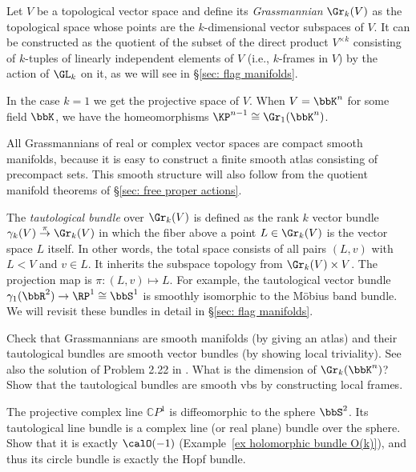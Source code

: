 \begin{example}
    Let $V$ be a topological vector space and define its \emph{Grassmannian} $\Gr_k(V)$ as the topological space whose points are the $k$-dimensional vector subspaces of $V$. It can be constructed as the quotient of the subset of the direct product $V^{\times k}$ consisting of $k$-tuples of linearly independent elements of $V$ (i.e., $k$-frames in $V$) by the action of $\GL_k$ on it, as we will see in \S\ref{sec: flag manifolds}.
    
    In the case $k=1$ we get the projective space of $V$. When $V=\bbK^n$ for some field $\bbK$, we have the homeomorphisms $\KP^{n-1}\cong \Gr_1(\bbK^n)$.
    
    All Grassmannians of real or complex vector spaces are compact smooth manifolds, because it is easy to construct a finite smooth atlas consisting of precompact sets. This smooth structure will also follow from the quotient manifold theorems of \S\ref{sec: free proper actions}.
    
    The \emph{tautological bundle} over $\Gr_k(V)$ is defined as the rank $k$ vector bundle $\gamma_{k}(V)\overset\pi\to \Gr_k(V)$ in which the fiber above a point $L\in \Gr_k(V)$ is the vector space $L$ itself. In other words, the total space consists of all pairs $(L,v)$ with $L<V$ and $v\in L$. It inherits the subspace topology from $\Gr_k(V)\times V$. The projection map is $\pi:(L,v)\mapsto L$.  For example, the tautological vector bundle $\gamma_1(\bbR^2)\to \RP^1\cong \bbS^1$ is smoothly isomorphic to the M\"obius band bundle. We will revisit these bundles in detail in \S\ref{sec: flag manifolds}.
\end{example}

\begin{xca}
    Check that Grassmannians are smooth manifolds (by giving an atlas) and their tautological bundles are smooth vector bundles (by showing local triviality). See also the solution of Problem 2.22 in \cite{Gadea}. What is the dimension of $\Gr_k(\bbK^n)$? Show that the tautological bundles are smooth \glspl{vb} by constructing local frames.
\end{xca}

\begin{xca}\label{xca hopf complex line bundle}
    The projective complex line $\mathbb{C}P^1$ is diffeomorphic to the sphere $\bbS^2$. Its tautological line bundle is a complex line (or real plane) bundle over the sphere. Show that it is exactly $\calO(-1)$ (Example~\ref{ex holomorphic bundle O(k)}), and thus its circle bundle is exactly the Hopf bundle.
\end{xca}









